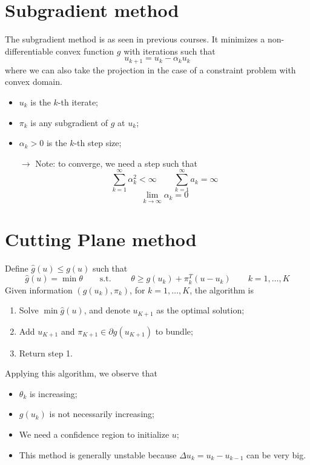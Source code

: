 \documentclass[12pt, openany]{report}
\theoremstyle{definition}
\begin{document}
\section{Subgradient method}
The subgradient method is as seen in previous courses. It minimizes a non-differentiable convex function $g$ with iterations such that 
\begin{equation}
	u_{k+1} = u_k - \alpha_k u_k
\end{equation}
where we can also take the projection in the case of a constraint problem with convex domain. 
\begin{itemize}
	\item $u_k$ is the $k$-th iterate;
	\item $\pi_k$ is any subgradient of $g$ at $u_k$;
	\item $\alpha_k>0$ is the $k$-th step size;
	\item [$\to$] Note: to converge, we need a step such that 
	\begin{equation}
		\sum_{k=1}^\infty \alpha_k^2 < \infty \qquad \sum_{k=1}^\infty a_k = \infty 
	\end{equation}
	\begin{equation}
		\lim_{k\to \infty} \alpha_k = 0
	\end{equation}
\end{itemize}
\section{Cutting Plane method}
Define $\hat g(u)\le g(u)$ such that 
\begin{equation}
	\hat g(u) = \min \theta \qquad \text{s.t. } \qquad \theta\ge g(u_k) + \pi_k^T (u-u_k) \qquad k=1,\dots,K
\end{equation}
Given information $(g(u_k),\pi_k)$, for $k=1,\dots,K$, the algorithm is 
\begin{enumerate}
	\item Solve $\min \hat g(u)$, and denote $u_{K+1}$ as the optimal solution;
	\item Add $u_{K+1}$ and $\pi_{K+1}\in \partial g(u_{K+1})$ to bundle;
	\item Return step 1.
\end{enumerate}
Applying this algorithm, we observe that 
\begin{itemize}
	\item $\theta_k$ is increasing;
	\item $g(u_k)$ is not necessarily increasing;
	\item We need a confidence region to initialize $u$;
	\item This method is generally unstable because $\Delta u_k=u_k-u_{k-1}$ can be very big.
\end{itemize}
\end{document}
